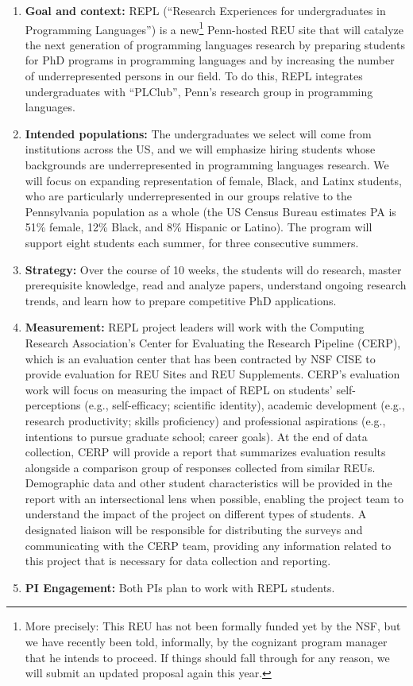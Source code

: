 \begin{enumerate}
\item {\bf Goal and context:} REPL (``Research Experiences for
undergraduates in Programming Languages'') is a new\footnote{More
  precisely: This REU has not been formally funded yet by the NSF, but
  we have recently been told, informally, by the cognizant program
  manager that he intends to proceed.  If things should fall through
  for any reason, we will submit an updated proposal again this year.}
Penn-hosted REU site that will catalyze the next generation of
programming languages research by preparing students for PhD programs
in programming languages and by increasing the number of
underrepresented persons in our field. To do this, REPL integrates
undergraduates with ``PLClub'', Penn’s research group in programming
languages.

\item {\bf Intended populations:} The undergraduates we select will
come from institutions across the US, and we will emphasize hiring
students whose backgrounds are underrepresented in programming
languages research. We will focus on expanding representation of
female, Black, and Latinx students, who are particularly
underrepresented in our
groups relative to the Pennsylvania population as a whole (the US Census Bureau
estimates PA is 51\% female, 12\% Black, and 8\% Hispanic or Latino).  The
program will support eight students  each
summer, for three consecutive summers.
\item {\bf Strategy:} Over the course of 10 weeks, the students will do
research, master prerequisite knowledge, read and analyze papers, understand
ongoing research trends, and learn how to prepare competitive PhD applications.
\item {\bf Measurement:}
REPL project leaders will work with the Computing Research Association’s Center for Evaluating the Research Pipeline (CERP), which is an evaluation center that has been contracted by NSF CISE to provide evaluation for REU Sites and REU Supplements. CERP’s evaluation work will focus on measuring the impact of REPL on students’ self-perceptions (e.g., self-efficacy; scientific identity), academic development (e.g., research productivity; skills proficiency) and professional aspirations (e.g., intentions to pursue graduate school; career goals). At the end of data collection, CERP will provide a report that summarizes evaluation results alongside a comparison group of responses collected from similar REUs. Demographic data and other student characteristics will be provided in the report with an intersectional lens when possible, enabling the project team to understand the impact of the project on different types of students. A designated liaison will be responsible for distributing the surveys and communicating with the CERP team, providing any information related to this project that is necessary for data collection and reporting.
\item {\bf PI Engagement:} Both PIs plan to work with REPL students.
\end{enumerate}

